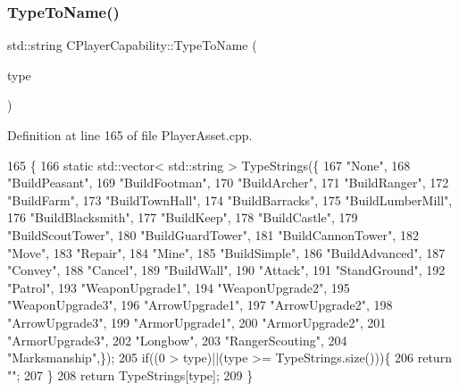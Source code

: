 \subsubsection{\texorpdfstring{Type\+To\+Name()}{TypeToName()}}
{\footnotesize\ttfamily std\+::string C\+Player\+Capability\+::\+Type\+To\+Name (\begin{DoxyParamCaption}\item[{\hyperlink{GameDataTypes_8h_a35b98ce26aca678b03c6f9f76e4778ce}{E\+Asset\+Capability\+Type}}]{type }\end{DoxyParamCaption})\hspace{0.3cm}{\ttfamily [static]}}



Definition at line 165 of file Player\+Asset.\+cpp.


\begin{DoxyCode}
165                                                                 \{
166     \textcolor{keyword}{static} std::vector< std::string > TypeStrings(\{
167         \textcolor{stringliteral}{"None"},
168         \textcolor{stringliteral}{"BuildPeasant"},
169         \textcolor{stringliteral}{"BuildFootman"},
170         \textcolor{stringliteral}{"BuildArcher"},
171         \textcolor{stringliteral}{"BuildRanger"},
172         \textcolor{stringliteral}{"BuildFarm"},
173         \textcolor{stringliteral}{"BuildTownHall"},
174         \textcolor{stringliteral}{"BuildBarracks"},
175         \textcolor{stringliteral}{"BuildLumberMill"},
176         \textcolor{stringliteral}{"BuildBlacksmith"},
177         \textcolor{stringliteral}{"BuildKeep"},
178         \textcolor{stringliteral}{"BuildCastle"},
179         \textcolor{stringliteral}{"BuildScoutTower"},
180         \textcolor{stringliteral}{"BuildGuardTower"},
181         \textcolor{stringliteral}{"BuildCannonTower"},
182         \textcolor{stringliteral}{"Move"},
183         \textcolor{stringliteral}{"Repair"},
184         \textcolor{stringliteral}{"Mine"},
185         \textcolor{stringliteral}{"BuildSimple"},
186         \textcolor{stringliteral}{"BuildAdvanced"},
187         \textcolor{stringliteral}{"Convey"},
188         \textcolor{stringliteral}{"Cancel"},
189         \textcolor{stringliteral}{"BuildWall"},
190         \textcolor{stringliteral}{"Attack"},
191         \textcolor{stringliteral}{"StandGround"},
192         \textcolor{stringliteral}{"Patrol"},
193         \textcolor{stringliteral}{"WeaponUpgrade1"},
194         \textcolor{stringliteral}{"WeaponUpgrade2"},
195         \textcolor{stringliteral}{"WeaponUpgrade3"},
196         \textcolor{stringliteral}{"ArrowUpgrade1"},
197         \textcolor{stringliteral}{"ArrowUpgrade2"},
198         \textcolor{stringliteral}{"ArrowUpgrade3"},
199         \textcolor{stringliteral}{"ArmorUpgrade1"},
200         \textcolor{stringliteral}{"ArmorUpgrade2"},
201         \textcolor{stringliteral}{"ArmorUpgrade3"},
202         \textcolor{stringliteral}{"Longbow"},
203         \textcolor{stringliteral}{"RangerScouting"},
204         \textcolor{stringliteral}{"Marksmanship"},\});
205     \textcolor{keywordflow}{if}((0 > type)||(type >= TypeStrings.size()))\{
206         \textcolor{keywordflow}{return} \textcolor{stringliteral}{""};
207     \}
208     \textcolor{keywordflow}{return} TypeStrings[type];
209 \}
\end{DoxyCode}
